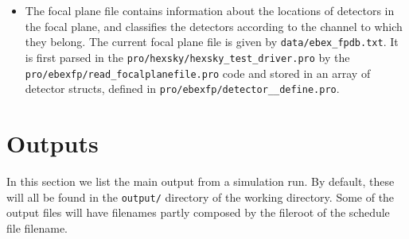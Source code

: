 \documentclass[a4paper,10pt]{article}
\begin{document}
\begin{itemize}
\item The focal plane file contains information about the locations of
detectors in the focal plane, and classifies the detectors according
to the channel to which they belong. The current focal plane file is
given by \texttt{data/ebex\_fpdb.txt}. It is first parsed in the
\texttt{pro/hexsky/hexsky\_test\_driver.pro} by the
\texttt{pro/ebexfp/read\_focalplanefile.pro} code and stored in an
array of detector structs, defined in
\texttt{pro/ebexfp/detector\_\_define.pro}.


\end{itemize}


\section{Outputs}

In this section we list the main output from a simulation run. By
default, these will all be found in the \texttt{output/} directory of
the working directory. Some of the output files will have filenames
partly composed by the fileroot of the schedule file filename.
\end{document}
